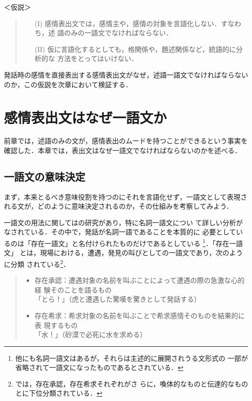 \begin{flushleft}
＜仮説＞
\end{flushleft}
\vspace{-0.5cm}
\begin{quote}
\begin{itemize}
 \item[(I)] 感情表出文では，感情主や，感情の対象を言語化しない．すなわち，述
       語のみの一語文でなければならない．
 \item[(II)] 仮に言語化するとしても，格関係や，題述関係など，統語的に分析的な
       方法をとってはいけない．
\end{itemize}
\end{quote}
\vspace{0.5cm}

発話時の感情を直接表出する感情表出文がなぜ，述語一語文でなければならない
のか，この仮説を次章において検証する．

\section{感情表出文はなぜ一語文か}

前章では，述語のみの文が，感情表出のムードを持つことができるという事実を
確認した．本章では，表出文はなぜ一語文でなければならないのかを述べる．

\subsection{一語文の意味決定}

まず，本来とるべき意味役割を持つのにそれを言語化せず，一語文として表現さ
れる文が，どのように意味決定されるのか，その仕組みを考察してみよう．

一語文の用法に関しては\cite{尾上1998}の研究があり，特に名詞一語文につい
て詳しい分析がなされている．その中で，発話が名詞一語であることを本質的に
必要としているのは「存在一語文」と名付けられたものだけであるとしている
\footnote{他にも名詞一語文はあるが，それらは主述的に展開されうる文形式の
一部が省略されて一語文になったものであるとされている．}．「存在一語文」
とは，現場における，遭遇，発見の叫びとしての一語文であり，次のように分類
されている\footnote{\cite{尾上1998}では，存在承認，存在希求それぞれがさ
らに，喚体的なものと伝達的なものとに下位分類されている．}．

\begin{quote}
 \begin{itemize}
  \item 存在承認：遭遇対象の名前を叫ぶことによって遭遇の際の急激な心的経
	験そのことを語るもの\\
	「とら！」（虎と遭遇した驚嘆を驚きとして発話する）
  \item 存在希求：希求対象の名前を叫ぶことで希求感情そのものを結果的に表
	現するもの\\
	「水！」（砂漠で必死に水を求める）
 \end{itemize}
\end{quote}

